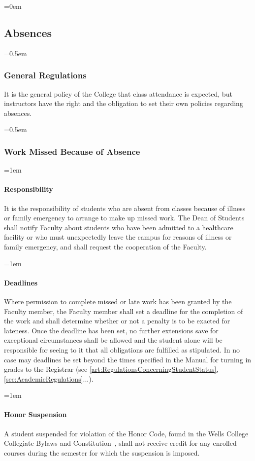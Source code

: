 \documentclass{manual}
\newcommand{\constitution}{Wells College Collegiate Bylaws and Constitution~}
\let\oldsubsection\subsection
\renewcommand\subsection{\leftskip=0em\oldsubsection}
\let\oldsubsubsection\subsubsection
\renewcommand\subsubsection{\leftskip=0.5em\oldsubsubsection}
\let\oldparagraph\paragraph
\renewcommand\paragraph{\leftskip=1em\oldparagraph}
\begin{document}
\subsection{Absences}


\subsubsection{General Regulations}

It is the general policy of the College that class attendance is expected, but instructors have the right and the obligation to set their own policies regarding absences.


\subsubsection{Work Missed Because of Absence}


\paragraph{Responsibility}
It is the responsibility of students who are absent from classes because of illness or family emergency to arrange to make up missed work. The Dean of Students shall notify Faculty about students who have been admitted to a healthcare facility or who must unexpectedly leave the campus for reasons of illness or family emergency, and shall request the cooperation of the Faculty.


\paragraph{Deadlines}
Where permission to complete missed or late work has been granted by the Faculty member, the Faculty member shall set a deadline for the completion of the work and shall determine whether or not a penalty is to be exacted for lateness. Once the deadline has been set, no further extensions save for exceptional circumstances shall be allowed and the student alone will be responsible for seeing to it that all obligations are fulfilled as stipulated. In no case may deadlines be set beyond the times specified in the Manual for turning in grades to the Registrar (see \cref{art:RegulationsConcerningStudentStatus}, \cref{sec:AcademicRegulations}...).


\paragraph{Honor Suspension}
A student suspended for violation of the Honor Code, found in the \constitution, shall not receive credit for any enrolled courses during the semester for which the suspension is imposed.
\end{document}
